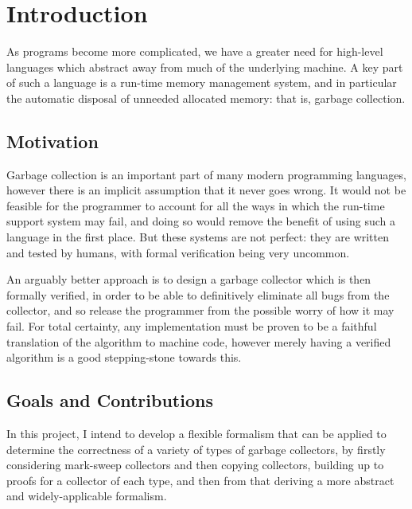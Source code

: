 \chapter{Introduction}
\label{sec:intro}

As programs become more complicated, we have a greater need for
high-level languages which abstract away from much of the underlying
machine. A key part of such a language is a run-time \gls{memory
  management} system, and in particular the automatic disposal of
unneeded allocated memory: that is, \gls{garbage collection}.

\section{Motivation}
\label{sec:intro-motivation}

Garbage collection is an important part of many modern programming
languages, however there is an implicit assumption that it never goes
wrong. It would not be feasible for the programmer to account for all
the ways in which the run-time support system may fail, and doing so
would remove the benefit of using such a language in the first
place. But these systems are not perfect: they are written and tested
by humans, with formal verification being very uncommon.

An arguably better approach is to design a \gls{garbage collector}
which is then formally verified, in order to be able to definitively
eliminate all bugs from the \gls{collector}, and so release the
programmer from the possible worry of how it may fail. For total
certainty, any implementation must be proven to be a faithful
translation of the algorithm to machine code, however merely having a
verified algorithm is a good stepping-stone towards this.

\section{Goals and Contributions}
\label{sec:intro-goals}

In this project, I intend to develop a flexible formalism that can be
applied to determine the correctness of a variety of types of
\glspl{garbage collector}, by firstly considering \gls{mark-sweep}
\glspl{collector} and then \gls{copying} \glspl{collector}, building
up to proofs for a \gls{collector} of each type, and then from that
deriving a more abstract and widely-applicable formalism.


